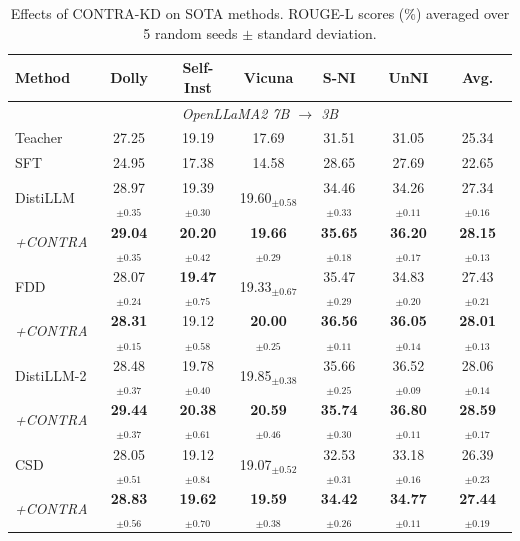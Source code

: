 \documentclass{article} %
\theoremstyle{definition}
\theoremstyle{remark}
\begin{document}
\begin{table}[t]
\centering
\small
\setlength{\tabcolsep}{4.5pt}
\caption{Effects of CONTRA-KD on SOTA methods. ROUGE-L scores (\%) averaged over 5 random seeds $\pm$ standard deviation.}
\label{tab:results}
\begin{tabular}{lcccccc}
\toprule
\textbf{Method} & \textbf{Dolly} & \textbf{Self-Inst} & \textbf{Vicuna} & \textbf{S-NI} & \textbf{UnNI} & \textbf{Avg.} \\
\midrule

\multicolumn{7}{c}{\textit{OpenLLaMA2 7B $\rightarrow$ 3B}} \\
\midrule
Teacher   & 27.25 & 19.19 & 17.69 & 31.51 & 31.05 & 25.34 \\
SFT       & 24.95 & 17.38 & 14.58 & 28.65 & 27.69 & 22.65 \\
\midrule
DistiLLM  & 28.97$_{\pm 0.35}$ & 19.39$_{\pm 0.30}$ & 19.60$_{\pm 0.58}$ & 34.46$_{\pm 0.33}$ & 34.26$_{\pm 0.11}$ & 27.34$_{\pm 0.16}$ \\
\textit{+CONTRA}
          & \textbf{29.04}$_{\pm 0.35}$ & \textbf{20.20}$_{\pm 0.42}$ & \textbf{19.66}$_{\pm 0.29}$ & \textbf{35.65}$_{\pm 0.18}$ & \textbf{36.20}$_{\pm 0.17}$ & \textbf{28.15}$_{\pm 0.13}$ \\
\midrule
FDD       & 28.07$_{\pm 0.24}$ & \textbf{19.47}$_{\pm 0.75}$ & 19.33$_{\pm 0.67}$ & 35.47$_{\pm 0.29}$ & 34.83$_{\pm 0.20}$ & 27.43$_{\pm 0.21}$ \\
\textit{+CONTRA}
          & \textbf{28.31}$_{\pm 0.15}$ & 19.12$_{\pm 0.58}$ & \textbf{20.00}$_{\pm 0.25}$ & \textbf{36.56}$_{\pm 0.11}$ & \textbf{36.05}$_{\pm 0.14}$ & \textbf{28.01}$_{\pm 0.13}$ \\
\midrule
DistiLLM-2 & 28.48$_{\pm 0.37}$ & 19.78$_{\pm 0.40}$ & 19.85$_{\pm 0.38}$ & 35.66$_{\pm 0.25}$ & 36.52$_{\pm 0.09}$ & 28.06$_{\pm 0.14}$ \\
\textit{+CONTRA}
          & \textbf{29.44}$_{\pm 0.37}$ & \textbf{20.38}$_{\pm 0.61}$ & \textbf{20.59}$_{\pm 0.46}$ & \textbf{35.74}$_{\pm 0.30}$ & \textbf{36.80}$_{\pm 0.11}$ & \textbf{28.59}$_{\pm 0.17}$ \\
\midrule
CSD       & 28.05$_{\pm 0.51}$ & 19.12$_{\pm 0.84}$ & 19.07$_{\pm 0.52}$ & 32.53$_{\pm 0.31}$ & 33.18$_{\pm 0.16}$ & 26.39$_{\pm 0.23}$ \\
\textit{+CONTRA}
          & \textbf{28.83}$_{\pm 0.56}$ & \textbf{19.62}$_{\pm 0.70}$ & \textbf{19.59}$_{\pm 0.38}$ & \textbf{34.42}$_{\pm 0.26}$ & \textbf{34.77}$_{\pm 0.11}$ & \textbf{27.44}$_{\pm 0.19}$ \\
\midrule


\end{tabular}
\end{table}
\end{document}
